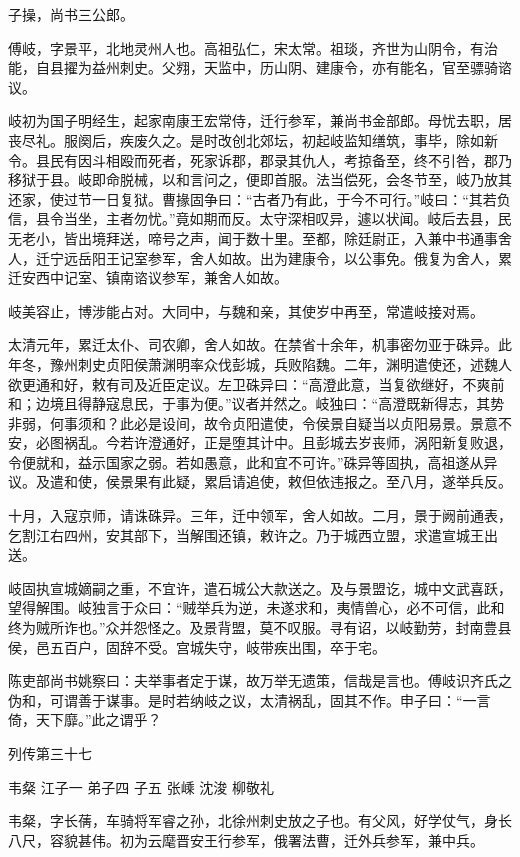 \documentclass[12pt,UTF8]{ctexbook}
\begin{document}
子操，尚书三公郎。

傅岐，字景平，北地灵州人也。高祖弘仁，宋太常。祖琰，齐世为山阴令，有治能，自县擢为益州刺史。父翙，天监中，历山阴、建康令，亦有能名，官至骠骑谘议。

岐初为国子明经生，起家南康王宏常侍，迁行参军，兼尚书金部郎。母忧去职，居丧尽礼。服阕后，疾废久之。是时改创北郊坛，初起岐监知缮筑，事毕，除如新令。县民有因斗相殴而死者，死家诉郡，郡录其仇人，考掠备至，终不引咎，郡乃移狱于县。岐即命脱械，以和言问之，便即首服。法当偿死，会冬节至，岐乃放其还家，使过节一日复狱。曹掾固争曰：“古者乃有此，于今不可行。”岐曰：“其若负信，县令当坐，主者勿忧。”竟如期而反。太守深相叹异，遽以状闻。岐后去县，民无老小，皆出境拜送，啼号之声，闻于数十里。至都，除廷尉正，入兼中书通事舍人，迁宁远岳阳王记室参军，舍人如故。出为建康令，以公事免。俄复为舍人，累迁安西中记室、镇南谘议参军，兼舍人如故。

岐美容止，博涉能占对。大同中，与魏和亲，其使岁中再至，常遣岐接对焉。

太清元年，累迁太仆、司农卿，舍人如故。在禁省十余年，机事密勿亚于硃异。此年冬，豫州刺史贞阳侯萧渊明率众伐彭城，兵败陷魏。二年，渊明遣使还，述魏人欲更通和好，敕有司及近臣定议。左卫硃异曰：“高澄此意，当复欲继好，不爽前和；边境且得静寇息民，于事为便。”议者并然之。岐独曰：“高澄既新得志，其势非弱，何事须和？此必是设间，故令贞阳遣使，令侯景自疑当以贞阳易景。景意不安，必图祸乱。今若许澄通好，正是堕其计中。且彭城去岁丧师，涡阳新复败退，令便就和，益示国家之弱。若如愚意，此和宜不可许。”硃异等固执，高祖遂从异议。及遣和使，侯景果有此疑，累启请追使，敕但依违报之。至八月，遂举兵反。

十月，入寇京师，请诛硃异。三年，迁中领军，舍人如故。二月，景于阙前通表，乞割江右四州，安其部下，当解围还镇，敕许之。乃于城西立盟，求遣宣城王出送。

岐固执宣城嫡嗣之重，不宜许，遣石城公大款送之。及与景盟讫，城中文武喜跃，望得解围。岐独言于众曰：“贼举兵为逆，未遂求和，夷情兽心，必不可信，此和终为贼所诈也。”众并怨怪之。及景背盟，莫不叹服。寻有诏，以岐勤劳，封南豊县侯，邑五百户，固辞不受。宫城失守，岐带疾出围，卒于宅。

陈吏部尚书姚察曰：夫举事者定于谋，故万举无遗策，信哉是言也。傅岐识齐氏之伪和，可谓善于谋事。是时若纳岐之议，太清祸乱，固其不作。申子曰：“一言倚，天下靡。”此之谓乎？





列传第三十七

韦粲 江子一 弟子四 子五 张嵊 沈浚 柳敬礼

韦粲，字长蒨，车骑将军睿之孙，北徐州刺史放之子也。有父风，好学仗气，身长八尺，容貌甚伟。初为云麾晋安王行参军，俄署法曹，迁外兵参军，兼中兵。
\end{document}
